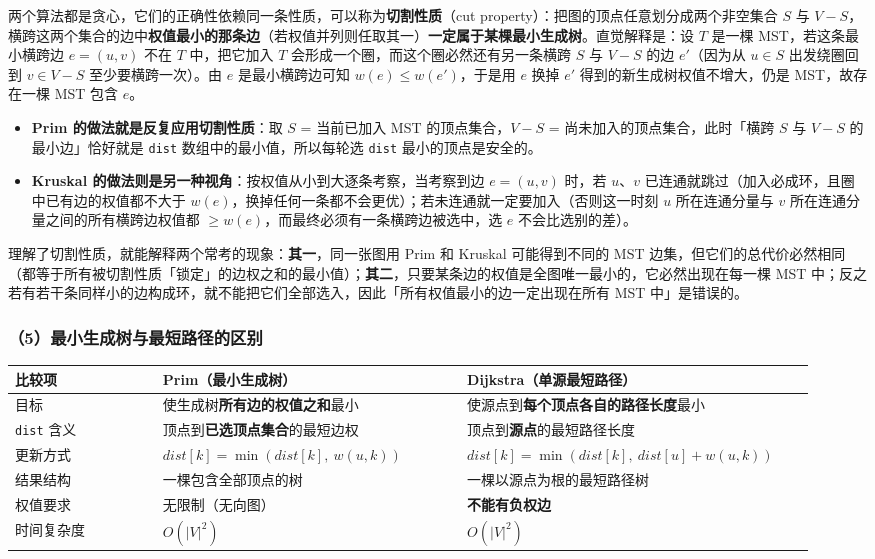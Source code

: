 \documentclass[11pt,openany,UTF8]{ctexbook}
\begin{document}
两个算法都是贪心，它们的正确性依赖同一条性质，可以称为\textbf{切割性质}（cut property）：把图的顶点任意划分成两个非空集合 $S$ 与 $V-S$，横跨这两个集合的边中\textbf{权值最小的那条边}（若权值并列则任取其一）\textbf{一定属于某棵最小生成树}。直觉解释是：设 $T$ 是一棵 MST，若这条最小横跨边 $e=(u,v)$ 不在 $T$ 中，把它加入 $T$ 会形成一个圈，而这个圈必然还有另一条横跨 $S$ 与 $V-S$ 的边 $e'$（因为从 $u\in S$ 出发绕圈回到 $v\in V-S$ 至少要横跨一次）。由 $e$ 是最小横跨边可知 $w(e)\le w(e')$，于是用 $e$ 换掉 $e'$ 得到的新生成树权值不增大，仍是 MST，故存在一棵 MST 包含 $e$。

\begin{itemize}
\item \textbf{Prim 的做法就是反复应用切割性质}：取 $S$ = 当前已加入 MST 的顶点集合，$V-S$ = 尚未加入的顶点集合，此时「横跨 $S$ 与 $V-S$ 的最小边」恰好就是 \texttt{dist} 数组中的最小值，所以每轮选 \texttt{dist} 最小的顶点是安全的。
\item \textbf{Kruskal 的做法则是另一种视角}：按权值从小到大逐条考察，当考察到边 $e=(u,v)$ 时，若 $u$、$v$ 已连通就跳过（加入必成环，且圈中已有边的权值都不大于 $w(e)$，换掉任何一条都不会更优）；若未连通就一定要加入（否则这一时刻 $u$ 所在连通分量与 $v$ 所在连通分量之间的所有横跨边权值都 $\ge w(e)$，而最终必须有一条横跨边被选中，选 $e$ 不会比选别的差）。
\end{itemize}
理解了切割性质，就能解释两个常考的现象：\textbf{其一}，同一张图用 Prim 和 Kruskal 可能得到不同的 MST 边集，但它们的总代价必然相同（都等于所有被切割性质「锁定」的边权之和的最小值）；\textbf{其二}，只要某条边的权值是全图唯一最小的，它必然出现在每一棵 MST 中；反之若有若干条同样小的边构成环，就不能把它们全部选入，因此「所有权值最小的边一定出现在所有 MST 中」是错误的。

\subsubsection{（5）最小生成树与最短路径的区别}

\begingroup\small\setlength{\tabcolsep}{4.0pt}
\begin{longtable}{@{}L{0.1795\linewidth}L{0.3528\linewidth}L{0.3962\linewidth}@{}}
\toprule
\textbf{比较项} & \textbf{Prim（最小生成树）} & \textbf{Dijkstra（单源最短路径）} \\
\midrule
\endhead
目标 & 使生成树\textbf{所有边的权值之和}最小 & 使源点到\textbf{每个顶点各自的路径长度}最小 \\
\texttt{dist} 含义 & 顶点到\textbf{已选顶点集合}的最短边权 & 顶点到\textbf{源点}的最短路径长度 \\
更新方式 & $dist[k]=\min(dist[k],\allowbreak\ w(u,k))$ & $dist[k]=\min(dist[k],\allowbreak\ dist[u]+w(u,k))$ \\
结果结构 & 一棵包含全部顶点的树 & 一棵以源点为根的最短路径树 \\
权值要求 & 无限制（无向图） & \textbf{不能有负权边} \\
时间复杂度 & $O(\lvert V\rvert^{2})$ & $O(\lvert V\rvert^{2})$ \\
\bottomrule
\end{longtable}
\endgroup
\end{document}

